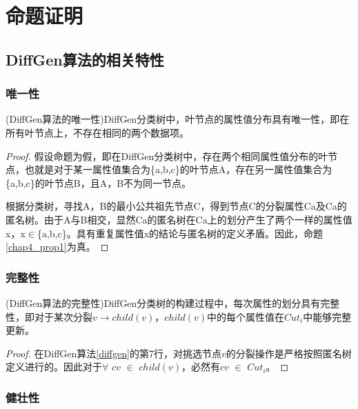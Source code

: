 \chapter{命题证明}
\label{proof}
\section{DiffGen算法的相关特性}

\subsection{唯一性}

\begin{prop}
	(DiffGen算法的唯一性)DiffGen分类树中，叶节点的属性值分布具有唯一性，即在所有叶节点上，不存在相同的两个数据项。
\end{prop}
\begin{proof}
	假设命题为假，即在DiffGen分类树中，存在两个相同属性值分布的叶节点，也就是对于某一属性值集合为\{a,b,c\}的叶节点A，存在另一属性值集合为\{a,b,c\}的叶节点B，且A，B不为同一节点。
	
	根据分类树，寻找A，B的最小公共祖先节点C，得到节点C的分裂属性Ca及Ca的匿名树。由于A与B相交，显然Ca的匿名树在Ca上的划分产生了两个一样的属性值x，x$\in$\{a,b,c\}。具有重复属性值x的结论与匿名树的定义矛盾。因此，命题\ref{chap4_prop1}为真。
\end{proof}

\subsection{完整性}

\begin{prop}
	(DiffGen算法的完整性)DiffGen分类树的构建过程中，每次属性的划分具有完整性，即对于某次分裂$v$$\rightarrow$$child(v)$，$child(v)$中的每个属性值在$Cut_{i}$中能够完整更新。
\end{prop}
\begin{proof}
	在DiffGen算法\ref{diffgen}的第7行，对挑选节点$v$的分裂操作是严格按照匿名树定义进行的。因此对于$\forall$ $cv$ $\in$ $child(v)$，必然有$cv$ $\in$ $Cut_{i}$。
\end{proof}

\subsection{健壮性}


